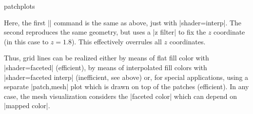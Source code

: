 \begin{pgfplotslibrary}{patchplots}
\begin{codeexample}[]
\end{codeexample}
\noindent Here, the first || command is the same as above, just with |shader=interp|. The second reproduces the same geometry, but uses a |z filter| to fix the $z$ coordinate (in this case to $z=1.8$). This effectively overrules all $z$ coordinates.

	Thus, grid lines can be realized either by means of flat fill color with |shader=faceted| (efficient), by means of interpolated fill colors with |shader=faceted interp| (inefficient, see above) or, for special applications, using a separate |patch,mesh| plot which is drawn on top of the patches (efficient). In any case, the mesh visualization considers the |faceted color| which can depend on |mapped color|.

\end{pgfplotslibrary}
